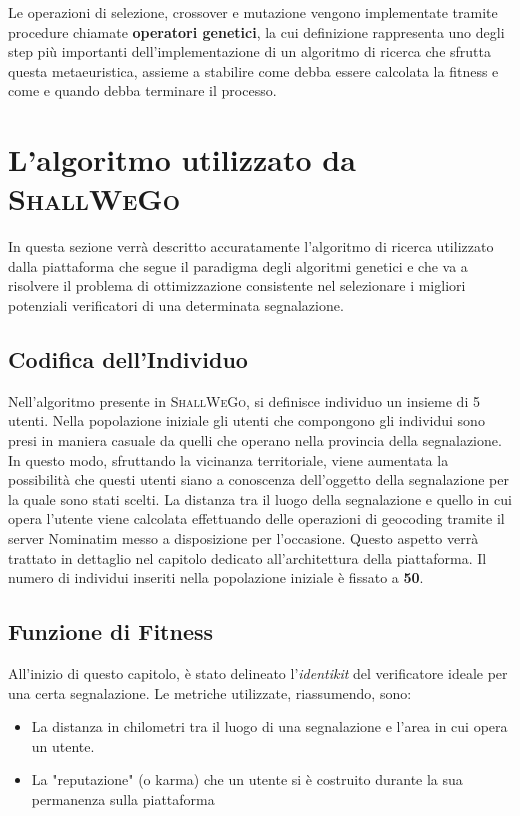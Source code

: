     Le operazioni di selezione, crossover e mutazione vengono implementate tramite procedure chiamate \textbf{operatori genetici}, la cui definizione rappresenta uno degli step più importanti dell'implementazione di un algoritmo di ricerca che sfrutta questa metaeuristica, assieme a stabilire come debba essere calcolata la fitness e come e quando debba terminare il processo. 

\section{L'algoritmo utilizzato da \textsc{ShallWeGo}}
    In questa sezione verrà descritto accuratamente l'algoritmo di ricerca utilizzato dalla piattaforma che segue il paradigma degli algoritmi genetici e che va a risolvere il problema di ottimizzazione consistente nel selezionare i migliori potenziali verificatori di una determinata segnalazione.

\subsection{Codifica dell'Individuo}
    Nell'algoritmo presente in \textsc{ShallWeGo}, si definisce individuo un insieme di 5 utenti. Nella popolazione iniziale gli utenti che compongono gli individui sono presi in maniera casuale da quelli che operano nella provincia della segnalazione. In questo modo, sfruttando la vicinanza territoriale, viene aumentata la possibilità che questi utenti siano a conoscenza dell'oggetto della segnalazione per la quale sono stati scelti. La distanza tra il luogo della segnalazione e quello in cui opera l'utente viene calcolata effettuando delle operazioni di geocoding tramite il server Nominatim messo a disposizione per l'occasione. Questo aspetto verrà trattato in dettaglio nel capitolo dedicato all'architettura della piattaforma. Il numero di individui inseriti nella popolazione iniziale è fissato a \textbf{50}.

\subsection{Funzione di Fitness}
    All'inizio di questo capitolo, è stato delineato l'\textit{identikit} del verificatore ideale per una certa segnalazione. Le metriche utilizzate, riassumendo, sono:

    \begin{itemize}
        \item La distanza in chilometri tra il luogo di una segnalazione e l'area in cui opera un utente.
        \item La "reputazione" (o karma) che un utente si è costruito durante la sua permanenza sulla piattaforma
    \end{itemize}

